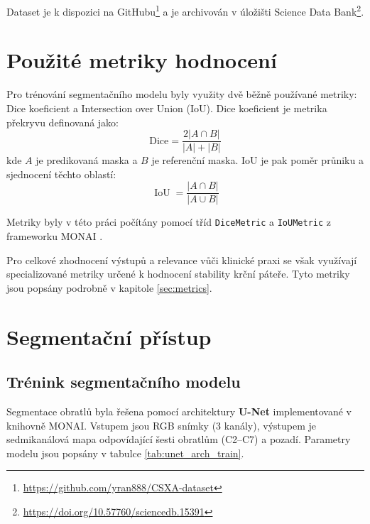 \documentclass[male,czech,api_bc]{kitheses}
\begin{document}
Dataset je k dispozici na GitHubu\footnote{\url{https://github.com/yran888/CSXA-dataset}} a je archivován v úložišti Science Data Bank\footnote{\url{https://doi.org/10.57760/sciencedb.15391}}.

\section{Použité metriky hodnocení}
Pro trénování segmentačního modelu byly využity dvě běžně používané metriky: Dice koeficient a Intersection over Union (IoU). Dice koeficient je metrika překryvu definovaná jako:
\begin{equation}
\text{Dice} = \frac{2|A \cap B|}{|A| + |B|}
\label{eq:dice}
\end{equation}
kde $A$ je predikovaná maska a $B$ je referenční maska. IoU je pak poměr průniku a sjednocení těchto oblastí:
\begin{equation}
\operatorname{IoU} = \frac{|A \cap B|}{|A \cup B|}
\label{eq:iou}
\end{equation}

\begin{samepage}
Metriky byly v této práci počítány pomocí tříd \texttt{DiceMetric} a \texttt{IoUMetric} z frameworku MONAI \cite{MONAIRepo}.

Pro celkové zhodnocení výstupů a relevance vůči klinické praxi se však využívají specializované metriky určené k hodnocení stability krční páteře. Tyto metriky jsou popsány podrobně v kapitole \ref{sec:metrics}.
\end{samepage}

\section{Segmentační přístup}
\label{sec:segmentation}

\subsection{Trénink segmentačního modelu}

Segmentace obratlů byla řešena pomocí architektury \textbf{U-Net} implementované v knihovně MONAI. Vstupem jsou RGB snímky (3 kanály), výstupem je sedmikanálová mapa odpovídající šesti obratlům (C2–C7) a pozadí. Parametry modelu jsou popsány v tabulce \ref{tab:unet_arch_train}.
\end{document}

